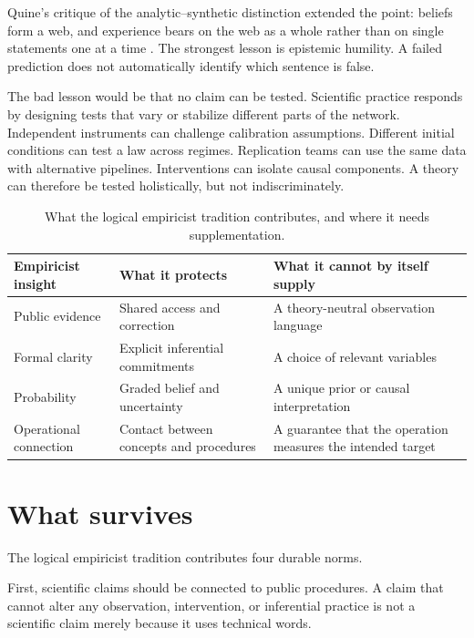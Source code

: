 Quine's critique of the analytic--synthetic distinction extended the point:
beliefs form a web, and experience bears on the web as a whole rather than on
single statements one at a time \citep{duhem1906,quine1951}. The strongest
lesson is epistemic humility. A failed prediction does not automatically
identify which sentence is false.

The bad lesson would be that no claim can be tested. Scientific practice
responds by designing tests that vary or stabilize different parts of the
network. Independent instruments can challenge calibration assumptions.
Different initial conditions can test a law across regimes. Replication teams
can use the same data with alternative pipelines. Interventions can isolate
causal components. A theory can therefore be tested holistically, but not
indiscriminately.

\begin{table}[ht]
\centering
\smalltable
\begin{tabularx}{\textwidth}{p{}YY}
\toprule
Empiricist insight & What it protects & What it cannot by itself supply\\
\midrule
Public evidence & Shared access and correction & A theory-neutral observation language\\
Formal clarity & Explicit inferential commitments & A choice of relevant variables\\
Probability & Graded belief and uncertainty & A unique prior or causal interpretation\\
Operational connection & Contact between concepts and procedures & A guarantee that the operation measures the intended target\\
\bottomrule
\end{tabularx}
\caption{What the logical empiricist tradition contributes, and where it needs
supplementation.}
\label{tab:empiricist-lessons}
\end{table}

\section{What survives}

The logical empiricist tradition contributes four durable norms.

First, scientific claims should be connected to public procedures. A claim that
cannot alter any observation, intervention, or inferential practice is not a
scientific claim merely because it uses technical words.

